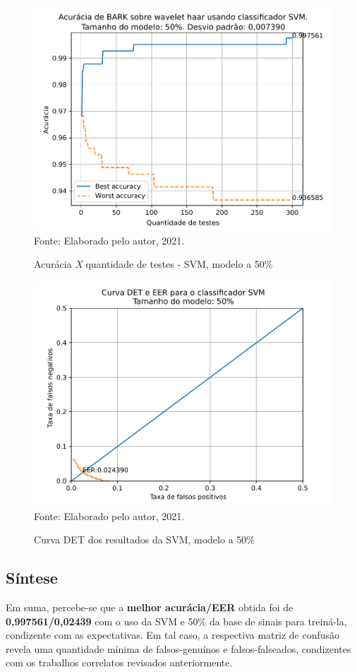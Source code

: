 			\begin{figure}[H]
				\centering
				\caption{Acurácia \textit{X} quantidade de testes - SVM, modelo a 50\%}
				\includegraphics[width=.9\linewidth]{images/results/confusionMatrices/classifier_SVM_50}
				\label{fig:classifiersvm50}
				\\Fonte: Elaborado pelo autor, 2021.
			\end{figure}
		
			\begin{figure}[H]
				\centering
				\caption{Curva DET dos resultados da SVM, modelo a 50\%}
				\includegraphics[width=.9\linewidth]{images/results/det/DET_for_classifier_SVM_50}
				\label{fig:detsvm50}
				\\Fonte: Elaborado pelo autor, 2021.
			\end{figure}

		\subsection{Síntese}
   			\par Em suma, percebe-se que a \textbf{melhor acurácia/EER} obtida foi de \textbf{0,997561/0,02439} com o uso da SVM e 50\% da base de sinais para treiná-la, condizente com as expectativas. Em tal caso, a respectiva matriz de confusão revela uma quantidade mínima de falsos-genuínos e falsos-falseados, condizentes com os trabalhos correlatos revisados anteriormente.

